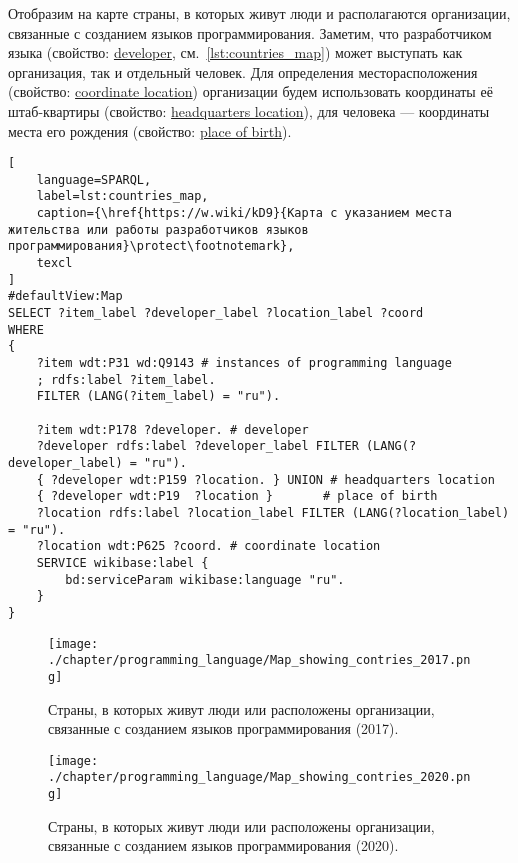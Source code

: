 Отобразим на карте страны, в которых живут люди и располагаются организации, связанные с созданием языков программирования. Заметим, что разработчиком языка (свойство: \href{https://www.wikidata.org/wiki/Property:P178}{developer}, см.~\ref{lst:countries_map}) может выступать как организация, так и отдельный человек. Для определения месторасположения (свойство: \href{https://www.wikidata.org/wiki/Property:P625}{coordinate location}) организации будем использовать координаты её штаб-квартиры (свойство: \href{https://www.wikidata.org/wiki/Property:P159}{headquarters location}), для человека --- координаты места его рождения (свойство: \href{https://www.wikidata.org/wiki/Property:P19}{place of birth}).

\begin{lstlisting}[
	language=SPARQL,
	label=lst:countries_map,
	caption={\href{https://w.wiki/kD9}{Карта с указанием места жительства или работы разработчиков языков программирования}\protect\footnotemark},
	texcl
]
#defaultView:Map
SELECT ?item_label ?developer_label ?location_label ?coord
WHERE
{
    ?item wdt:P31 wd:Q9143 # instances of programming language
    ; rdfs:label ?item_label.     
    FILTER (LANG(?item_label) = "ru"). 
  
    ?item wdt:P178 ?developer. # developer
    ?developer rdfs:label ?developer_label FILTER (LANG(?developer_label) = "ru"). 
    { ?developer wdt:P159 ?location. } UNION # headquarters location
    { ?developer wdt:P19  ?location }       # place of birth
    ?location rdfs:label ?location_label FILTER (LANG(?location_label) = "ru").
    ?location wdt:P625 ?coord. # coordinate location
    SERVICE wikibase:label {
        bd:serviceParam wikibase:language "ru".
    }   	
}
\end{lstlisting}

\begin{figure}[h]
\centering
	\texttt{[image: ./chapter/programming\_language/Map\_showing\_contries\_2017.png]}
	\caption{Страны, в которых живут люди или расположены организации, связанные с созданием языков программирования (2017).}
	\label{fig:countries_2017}
\end{figure}
\begin{figure}
\centering
	\texttt{[image: ./chapter/programming\_language/Map\_showing\_contries\_2020.png]}
	\caption{Страны, в которых живут люди или расположены организации, связанные с созданием языков программирования (2020).}
	\label{fig:countries_2020}
\end{figure}

